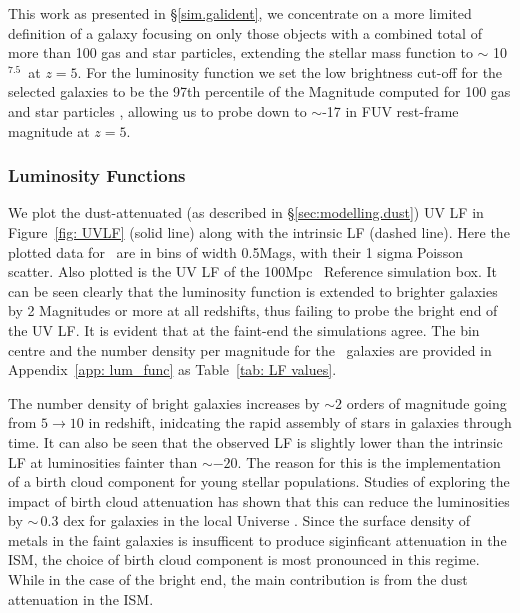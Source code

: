This work as presented in \S\ref{sim.galident}, we concentrate on a more limited definition of a galaxy focusing on only those objects with a combined total of more than 100 gas and star particles, extending the stellar mass function to $\sim$ 10$^{7.5}$\Msun\, at $z=5$. For the luminosity function we set the low brightness cut-off for the selected galaxies to be the 97th percentile of the Magnitude computed for 100 gas and star particles , allowing us to probe down to $\sim$-17 in FUV rest-frame magnitude at $z=5$. 

\subsubsection{Luminosity Functions}\label{sec: PhotProp.UVLF.LF}
We plot the dust-attenuated (as described in \S\ref{sec:modelling.dust}) UV LF in Figure~\ref{fig: UVLF} (solid line) along with the intrinsic LF (dashed line). Here the plotted data for \flares\, are in bins of width 0.5Mags, with their 1 sigma Poisson scatter. Also plotted is the UV LF of the 100Mpc \eagle\, Reference simulation box.  It can be seen clearly that the luminosity function is extended to brighter galaxies by 2 Magnitudes or more at all redshifts, thus failing to probe the bright end of the UV LF. It is evident that at the faint-end the simulations agree. The bin centre and the number density per magnitude for the \flares\, galaxies are provided in Appendix~\ref{app: lum_func} as Table~\ref{tab: LF values}. 

The number density of bright galaxies increases by $\sim2$ orders of magnitude going from $5\to10$ in redshift, inidcating the rapid assembly of stars in galaxies through time. It can also be seen that the observed LF is slightly lower than the intrinsic LF at luminosities fainter than $\sim-20$. The reason for this is the implementation of a birth cloud component for young stellar populations. Studies of exploring the impact of birth cloud attenuation has shown that this can reduce the luminosities by $\sim\,0.3$ dex for galaxies in the local Universe \citep[\eg][]{Trayford2017}. Since the surface density of metals in the faint galaxies is insufficent to produce siginficant attenuation in the ISM, the choice of birth cloud component is most pronounced in this regime. While in the case of the bright end, the main contribution is from the dust attenuation in the ISM. 

